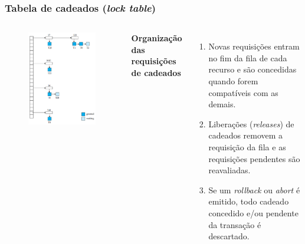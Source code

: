 \documentclass{beamer}
\begin{document}
    
\begin{frame} %
    \frametitle{Tabela de cadeados (\emph{lock table})}
    \begin{columns}[c] %
    
        \begin{figure}
            \includegraphics[width=0.8\linewidth]{locktable.png}
        \end{figure}
    
    
        \textbf{Organização das requisições de cadeados}
        \begin{enumerate}
            \item Novas requisições entram no fim da fila de cada recurso e são concedidas quando forem compatíveis com as demais.
            \item Liberações (\emph{releases}) de cadeados removem a requisição da fila e as requisições pendentes são reavaliadas.
            \item Se um \emph{rollback} ou \emph{abort} é emitido, todo cadeado concedido e/ou pendente da transação é descartado.
        \end{enumerate}
    \end{columns}
\end{frame}
\end{document}
